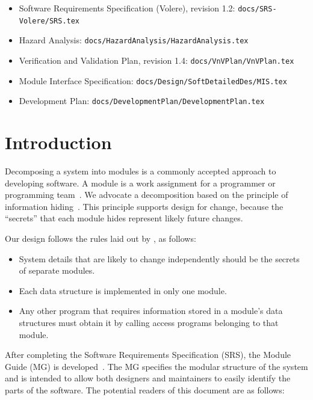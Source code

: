 \documentclass[12pt, titlepage]{article}
\begin{document}
\begin{itemize}
  \item Software Requirements Specification (Volere), revision 1.2:
  \texttt{docs/SRS-Volere/SRS.tex}
  \item Hazard Analysis: \texttt{docs/HazardAnalysis/HazardAnalysis.tex}
  \item Verification and Validation Plan, revision 1.4: \texttt{docs/VnVPlan/VnVPlan.tex}
  \item Module Interface Specification:
  \texttt{docs/Design/SoftDetailedDes/MIS.tex}
  \item Development Plan: \texttt{docs/DevelopmentPlan/DevelopmentPlan.tex}
\end{itemize}

\newpage

\tableofcontents

\listoftables

\listoffigures

\newpage


\section{Introduction}

Decomposing a system into modules is a commonly accepted approach to developing
software. A module is a work assignment for a programmer or programming
team~\citep{ParnasEtAl1984}. We advocate a decomposition based on the principle
of information hiding~\citep{Parnas1972a}. This principle supports design for
change, because the ``secrets'' that each module hides represent likely future
changes.

Our design follows the rules laid out by \citet{ParnasEtAl1984}, as follows:
\begin{itemize}
\item System details that are likely to change independently should be the
  secrets of separate modules.
\item Each data structure is implemented in only one module.
\item Any other program that requires information stored in a module's data
  structures must obtain it by calling access programs belonging to that module.
\end{itemize}

After completing the Software Requirements Specification (SRS), the Module Guide
(MG) is developed~\citep{ParnasEtAl1984}. The MG specifies the modular structure
of the system and is intended to allow both designers and maintainers to easily
identify the parts of the software. The potential readers of this document are
as follows:
\end{document}
